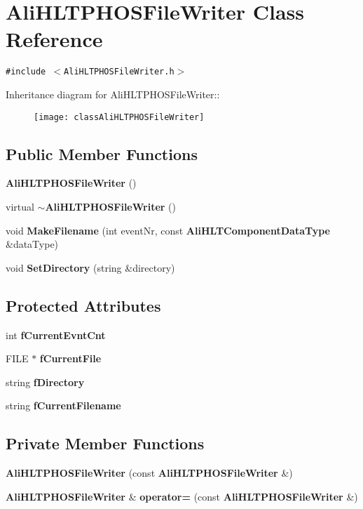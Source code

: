 \section{Ali\-HLTPHOSFile\-Writer Class Reference}
\label{classAliHLTPHOSFileWriter}
{\tt \#include $<$Ali\-HLTPHOSFile\-Writer.h$>$}

Inheritance diagram for Ali\-HLTPHOSFile\-Writer::\begin{figure}[H]
\begin{center}
\leavevmode
\texttt{[image: classAliHLTPHOSFileWriter]}
\end{center}
\end{figure}
\subsection*{Public Member Functions}
\begin{CompactItemize}
\item 
{\bf Ali\-HLTPHOSFile\-Writer} ()
\item 
virtual {\bf $\sim$Ali\-HLTPHOSFile\-Writer} ()
\item 
void {\bf Make\-Filename} (int event\-Nr, const {\bf Ali\-HLTComponent\-Data\-Type} \&data\-Type)
\item 
void {\bf Set\-Directory} (string \&directory)
\end{CompactItemize}
\subsection*{Protected Attributes}
\begin{CompactItemize}
\item 
int {\bf f\-Current\-Evnt\-Cnt}
\item 
FILE $\ast$ {\bf f\-Current\-File}
\item 
string {\bf f\-Directory}
\item 
string {\bf f\-Current\-Filename}
\end{CompactItemize}
\subsection*{Private Member Functions}
\begin{CompactItemize}
\item 
{\bf Ali\-HLTPHOSFile\-Writer} (const {\bf Ali\-HLTPHOSFile\-Writer} \&)
\item 
{\bf Ali\-HLTPHOSFile\-Writer} \& {\bf operator=} (const {\bf Ali\-HLTPHOSFile\-Writer} \&)
\end{CompactItemize}


